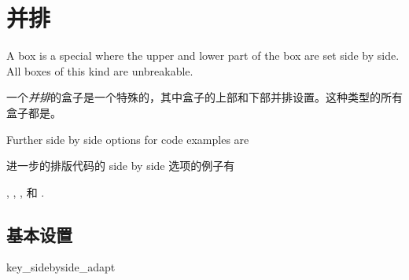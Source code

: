 
\setcounter{section}{5}
\setcounter{subsection}{2}

\section{并排}\label{sec:sidebyside}%
%

A  box is a special  where
the upper and lower part of the box are set side by side.
All boxes of this kind are unbreakable.


一个\emph{并排}的盒子是一个特殊的，其中盒子的上部和下部并排设置。这种类型的所有盒子都是。


\begin{marker}
Further side by side options for code examples are

进一步的排版代码的 side by side 选项的例子有

,
,
, 和
.
\end{marker}

\subsection{基本设置}\label{subsec:sidebyside_basic}





key_sidebyside_adapt



 


